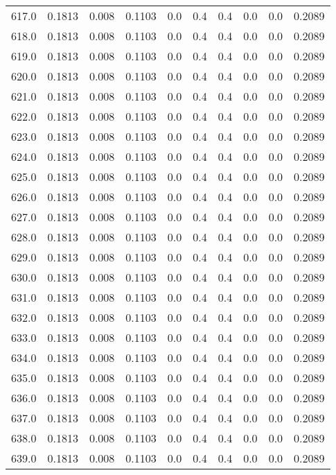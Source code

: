 \begin{longtable}{lrrrrrrrrr}
617.0 & 0.1813 & 0.008 & 0.1103 & 0.0 & 0.4 & 0.4 & 0.0 & 0.0 & 0.2089 \\
618.0 & 0.1813 & 0.008 & 0.1103 & 0.0 & 0.4 & 0.4 & 0.0 & 0.0 & 0.2089 \\
619.0 & 0.1813 & 0.008 & 0.1103 & 0.0 & 0.4 & 0.4 & 0.0 & 0.0 & 0.2089 \\
620.0 & 0.1813 & 0.008 & 0.1103 & 0.0 & 0.4 & 0.4 & 0.0 & 0.0 & 0.2089 \\
621.0 & 0.1813 & 0.008 & 0.1103 & 0.0 & 0.4 & 0.4 & 0.0 & 0.0 & 0.2089 \\
622.0 & 0.1813 & 0.008 & 0.1103 & 0.0 & 0.4 & 0.4 & 0.0 & 0.0 & 0.2089 \\
623.0 & 0.1813 & 0.008 & 0.1103 & 0.0 & 0.4 & 0.4 & 0.0 & 0.0 & 0.2089 \\
624.0 & 0.1813 & 0.008 & 0.1103 & 0.0 & 0.4 & 0.4 & 0.0 & 0.0 & 0.2089 \\
625.0 & 0.1813 & 0.008 & 0.1103 & 0.0 & 0.4 & 0.4 & 0.0 & 0.0 & 0.2089 \\
626.0 & 0.1813 & 0.008 & 0.1103 & 0.0 & 0.4 & 0.4 & 0.0 & 0.0 & 0.2089 \\
627.0 & 0.1813 & 0.008 & 0.1103 & 0.0 & 0.4 & 0.4 & 0.0 & 0.0 & 0.2089 \\
628.0 & 0.1813 & 0.008 & 0.1103 & 0.0 & 0.4 & 0.4 & 0.0 & 0.0 & 0.2089 \\
629.0 & 0.1813 & 0.008 & 0.1103 & 0.0 & 0.4 & 0.4 & 0.0 & 0.0 & 0.2089 \\
630.0 & 0.1813 & 0.008 & 0.1103 & 0.0 & 0.4 & 0.4 & 0.0 & 0.0 & 0.2089 \\
631.0 & 0.1813 & 0.008 & 0.1103 & 0.0 & 0.4 & 0.4 & 0.0 & 0.0 & 0.2089 \\
632.0 & 0.1813 & 0.008 & 0.1103 & 0.0 & 0.4 & 0.4 & 0.0 & 0.0 & 0.2089 \\
633.0 & 0.1813 & 0.008 & 0.1103 & 0.0 & 0.4 & 0.4 & 0.0 & 0.0 & 0.2089 \\
634.0 & 0.1813 & 0.008 & 0.1103 & 0.0 & 0.4 & 0.4 & 0.0 & 0.0 & 0.2089 \\
635.0 & 0.1813 & 0.008 & 0.1103 & 0.0 & 0.4 & 0.4 & 0.0 & 0.0 & 0.2089 \\
636.0 & 0.1813 & 0.008 & 0.1103 & 0.0 & 0.4 & 0.4 & 0.0 & 0.0 & 0.2089 \\
637.0 & 0.1813 & 0.008 & 0.1103 & 0.0 & 0.4 & 0.4 & 0.0 & 0.0 & 0.2089 \\
638.0 & 0.1813 & 0.008 & 0.1103 & 0.0 & 0.4 & 0.4 & 0.0 & 0.0 & 0.2089 \\
639.0 & 0.1813 & 0.008 & 0.1103 & 0.0 & 0.4 & 0.4 & 0.0 & 0.0 & 0.2089 \\

\end{longtable}
